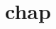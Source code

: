 \documentclass{book}
\newcommand{\Texinfothechapterheading}{}
\newcommand{\Texinfoheadingchaptername}{\chaptername}
\newcommand{\Texinfochapter}[1]{\chapter{#1}
\renewcommand{\Texinfothechapterheading}{\Texinfoheadingchaptername{} \thechapter{} }%
}%
\renewcommand{\_}{\Texinfounderscore\discretionary{}{}{}}
\begin{document}
\Texinfochapter{{chap}}
\label{anchor:chap}%
\end{document}
